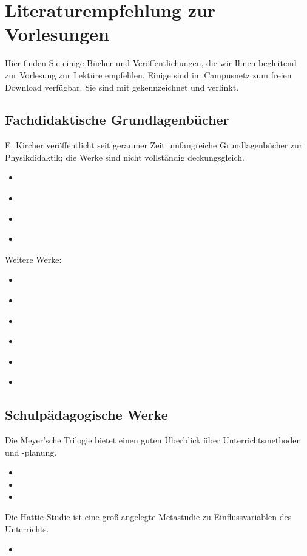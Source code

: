 \chapter{Literaturempfehlung zur Vorlesungen}
Hier finden Sie einige Bücher und Veröffentlichungen, die wir Ihnen begleitend zur Vorlesung zur Lektüre empfehlen. Einige sind im Campusnetz zum freien Download verfügbar. Sie sind mit \faFilePdf[refular] gekennzeichnet und verlinkt.

\section{Fachdidaktische Grundlagenbücher}
E. Kircher veröffentlicht seit geraumer Zeit umfangreiche Grundlagenbücher zur Physikdidaktik; die Werke sind nicht vollständig deckungsgleich.
\begin{itemize}
	\item {} \href{https://link.springer.com/book/10.1007/978-3-662-59490-2}{\faFilePdf[regular]}
	\item {} \href{https://link.springer.com/book/10.1007/978-3-662-59496-4}{\faFilePdf[regular]}
	\item {} \href{https://link.springer.com/book/10.1007/978-3-642-01602-8}{\faFilePdf[regular]}
	\item {} \href{https://link.springer.com/book/10.1007/978-3-642-56386-7}{\faFilePdf[regular]}
\end{itemize}

Weitere Werke:
\begin{itemize}
	\item {}
	\item {} \href{https://link.springer.com/book/10.1007/978-3-662-57270-2}{\faFilePdf[regular]}
	\item {} \href{https://link.springer.com/book/10.1007/978-3-662-63053-2}{\faFilePdf[regular]}
	\item {}
	\item {} \href{https://www.degruyter.com/document/doi/10.1524/9783486721249/html}{\faFilePdf[regular]} 
	\item {}
\end{itemize}

\section{Schulpädagogische Werke}
Die Meyer'sche Trilogie bietet einen guten Überblick über Unterrichtsmethoden und -planung.
\begin{itemize}
	\item {}
	\item {}
	\item {}
\end{itemize}
Die Hattie-Studie ist eine groß angelegte Metastudie zu Einflussvariablen des Unterrichts.
\begin{itemize}
	\item {}
\end{itemize}

